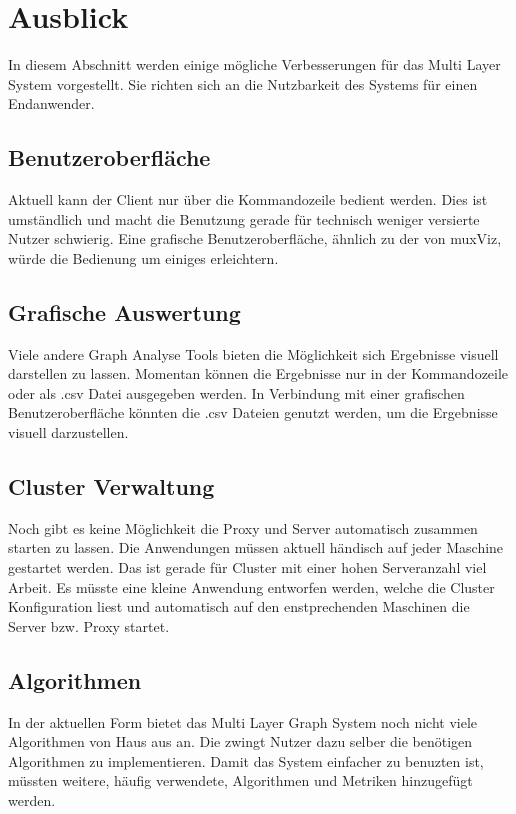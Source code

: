 \section{Ausblick}

In diesem Abschnitt werden einige mögliche Verbesserungen für das Multi Layer System vorgestellt.
Sie richten sich an die Nutzbarkeit des Systems für einen Endanwender.


\subsection{Benutzeroberfläche}

Aktuell kann der Client nur über die Kommandozeile bedient werden. Dies ist umständlich und macht die Benutzung gerade für technisch weniger versierte Nutzer schwierig.
Eine grafische Benutzeroberfläche, ähnlich zu der von muxViz, würde die Bedienung um einiges erleichtern. 

\subsection{Grafische Auswertung}

Viele andere Graph Analyse Tools bieten die Möglichkeit sich Ergebnisse visuell darstellen zu lassen. Momentan können die Ergebnisse nur in der Kommandozeile oder als .csv Datei ausgegeben werden.
In Verbindung mit einer grafischen Benutzeroberfläche könnten die .csv Dateien genutzt werden, um die Ergebnisse visuell darzustellen.

\subsection{Cluster Verwaltung}

Noch gibt es keine Möglichkeit die Proxy und Server automatisch zusammen starten zu lassen. Die Anwendungen müssen aktuell händisch auf jeder Maschine gestartet werden. Das ist gerade für Cluster mit einer hohen Serveranzahl viel Arbeit.
Es müsste eine kleine Anwendung entworfen werden, welche die Cluster Konfiguration liest und automatisch auf den enstprechenden Maschinen die Server bzw. Proxy startet.

\subsection{Algorithmen}

In der aktuellen Form bietet das Multi Layer Graph System noch nicht viele Algorithmen von Haus aus an. Die zwingt Nutzer dazu selber die benötigen Algorithmen zu implementieren. Damit das System einfacher zu benuzten ist,
müssten weitere, häufig verwendete, Algorithmen und Metriken hinzugefügt werden.

